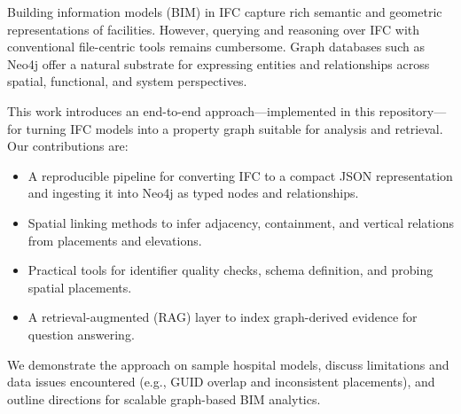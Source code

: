 Building information models (BIM) in IFC capture rich semantic and geometric representations of facilities. However, querying and reasoning over IFC with conventional file-centric tools remains cumbersome. Graph databases such as Neo4j offer a natural substrate for expressing entities and relationships across spatial, functional, and system perspectives.

This work introduces an end-to-end approach---implemented in this repository---for turning IFC models into a property graph suitable for analysis and retrieval. Our contributions are:

\begin{itemize}[leftmargin=*]
  \item A reproducible pipeline for converting IFC to a compact JSON representation and ingesting it into Neo4j as typed nodes and relationships.
  \item Spatial linking methods to infer adjacency, containment, and vertical relations from placements and elevations.
  \item Practical tools for identifier quality checks, schema definition, and probing spatial placements.
  \item A retrieval-augmented (RAG) layer to index graph-derived evidence for question answering.
\end{itemize}

We demonstrate the approach on sample hospital models, discuss limitations and data issues encountered (e.g., GUID overlap and inconsistent placements), and outline directions for scalable graph-based BIM analytics.

